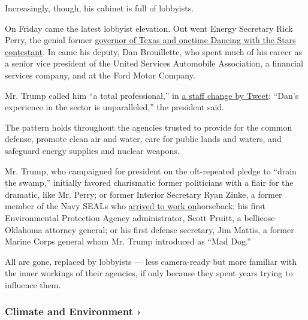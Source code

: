Increasingly, though, his cabinet is full of lobbyists.

On Friday came the latest lobbyist elevation. Out went Energy Secretary
Rick Perry, the genial former
\href{https://www.nytimes3xbfgragh.onion/2016/12/13/us/politics/rick-perry-energy-secretary-trump.html}{governor
of Texas and onetime Dancing with the Stars contestant}. In came his
deputy, Dan Brouillette, who spent much of his career as a senior vice
president of the United Services Automobile Association, a financial
services company, and at the Ford Motor Company.

Mr. Trump called him ``a total professional,'' in
\href{https://twitter.com/realDonaldTrump/status/1185277957436248065?s=20}{a
staff change by Tweet}: ``Dan's experience in the sector is
unparalleled,'' the president said.

The pattern holds throughout the agencies trusted to provide for the
common defense, promote clean air and water, care for public lands and
waters, and safeguard energy supplies and nuclear weapons.

Mr. Trump, who campaigned for president on the oft-repeated pledge to
``drain the swamp,'' initially favored charismatic former politicians
with a flair for the dramatic, like Mr. Perry; or former Interior
Secretary Ryan Zinke, a former member of the Navy SEALs who
\href{https://www.nytimes3xbfgragh.onion/2017/03/02/us/politics/secretary-ryan-zinke-horse-interior.html}{arrived
to work on}horseback; his first Environmental Protection Agency
administrator, Scott Pruitt, a bellicose Oklahoma attorney general; or
his first defense secretary, Jim Mattis, a former Marine Corps general
whom Mr. Trump introduced as ``Mad Dog.''

All are gone, replaced by lobbyists --- less camera-ready but more
familiar with the inner workings of their agencies, if only because they
spent years trying to influence them.

\href{\%3Ca\%20href=\%22https://www.nytimes3xbfgragh.onion/section/climate?action=click\&pgtype=Article\&state=default\&region=MAIN_CONTENT_1\&context=storylines_keepup\%22\%3Ehttps://www.nytimes3xbfgragh.onion/section/climate?action=click\&pgtype=Article\&state=default\&region=MAIN_CONTENT_1\&context=storylines_keepup\%3C/a\%3E}{}

\hypertarget{climate-and-environment-}{%
\subsubsection{Climate and Environment
›}\label{climate-and-environment-}}

